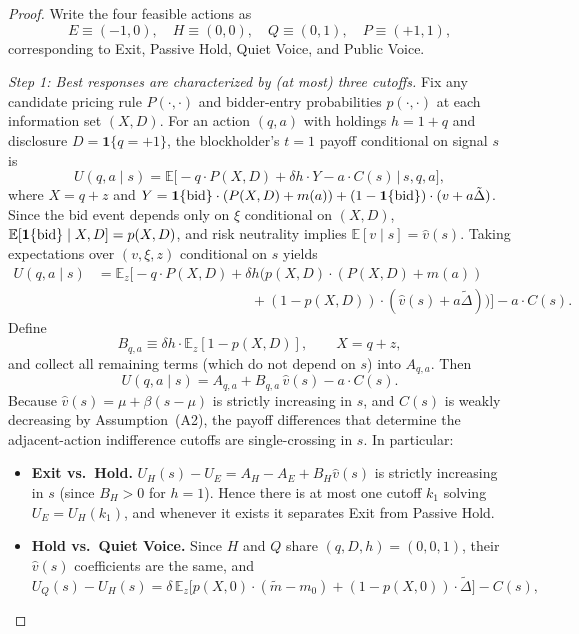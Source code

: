 \documentclass[11pt]{article}
\newcommand{\E}{\mathbb{E}}
\newcommand{\1}{\mathbf{1}}
\begin{document}
\begin{proof}
Write the four feasible actions as
\[
E\equiv(-1,0),\quad H\equiv(0,0),\quad Q\equiv(0,1),\quad P\equiv(+1,1),
\]
corresponding to Exit, Passive Hold, Quiet Voice, and Public Voice.

\textit{Step 1: Best responses are characterized by (at most) three cutoffs.}
Fix any candidate pricing rule $P(\cdot,\cdot)$ and bidder-entry probabilities $p(\cdot,\cdot)$ at each information set $(X,D)$. For an action $(q,a)$ with holdings $h=1+q$ and disclosure $D=\1\{q=+1\}$, the blockholder's $t=1$ payoff conditional on signal $s$ is
\[
U(q,a \mid s)
= \E\Big[-q\cdot P(X,D) + \delta h \cdot Y - a\cdot C(s) \,\Big|\, s,q,a\Big],
\]
where $X=q+z$ and $Y=\1\{\textup{bid}\}\cdot (P(X,D)+m(a)) + (1-\1\{\textup{bid}\})\cdot (v+a\tilde{\Delta})$.
Since the bid event depends only on $\xi$ conditional on $(X,D)$, $\E[\1\{\textup{bid}\} \mid X,D]=p(X,D)$, and risk neutrality implies $\E[v \mid s]=\hat v(s)$. Taking expectations over $(v,\xi,z)$ conditional on $s$ yields
\begin{align*}
U(q,a \mid s)
&= \E_z\Big[-q\cdot P(X,D) + \delta h \big(p(X,D)\cdot (P(X,D)+m(a)) \\
&\qquad\qquad\qquad\qquad\qquad\quad + (1-p(X,D))\cdot(\hat{v}(s)+a\tilde{\Delta})\big)\Big] - a\cdot C(s).
\end{align*}
Define
\[
B_{q,a}\equiv \delta h\cdot \E_z[1-p(X,D)],\qquad X=q+z,
\]
and collect all remaining terms (which do not depend on $s$) into $A_{q,a}$. Then
\begin{equation}
U(q,a \mid s)=A_{q,a}+B_{q,a}\,\hat{v}(s)-a\cdot C(s).
\label{eq:U-affine}
\end{equation}
Because $\hat v(s)=\mu+\beta(s-\mu)$ is strictly increasing in $s$, and $C(s)$ is weakly decreasing by Assumption~\textup{(A2)}, the payoff differences that determine the adjacent-action indifference cutoffs are single-crossing in $s$. In particular:
\begin{itemize}[leftmargin=1.5em,itemsep=2pt]
\item \textbf{Exit vs.\ Hold.} $U_H(s)-U_E=A_{H}-A_{E}+B_{H}\hat v(s)$ is strictly increasing in $s$ (since $B_H>0$ for $h=1$). Hence there is at most one cutoff $k_1$ solving $U_E=U_H(k_1)$, and whenever it exists it separates Exit from Passive Hold.
\item \textbf{Hold vs.\ Quiet Voice.} Since $H$ and $Q$ share $(q,D,h)=(0,0,1)$, their $\hat v(s)$ coefficients are the same, and
\begin{equation}
U_Q(s)-U_H(s)=\delta\,\E_z\!\Big[p(X,0)\cdot(\tilde m-m_0)+(1-p(X,0))\cdot\tilde\Delta\Big]-C(s),

\end{equation}
\end{itemize}
\end{proof}
\end{document}

